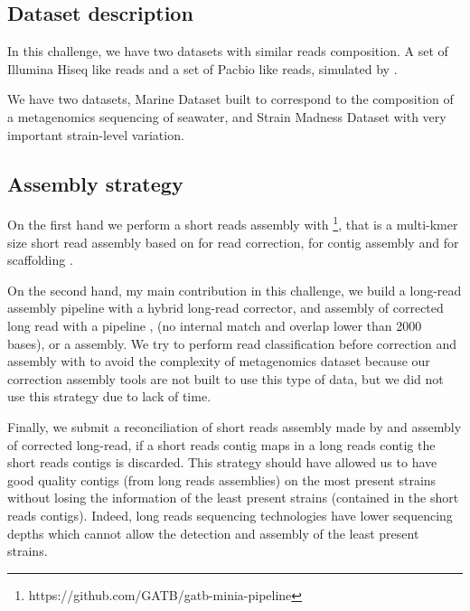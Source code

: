 \documentclass[main.tex]{subfiles}
\begin{document}
\subsection{Dataset description}

In this challenge, we have two datasets with similar reads composition. A set of Illumina Hiseq like reads and a set of Pacbio like reads, simulated by \cite{camisim}.

We have two datasets, Marine Dataset built to correspond to the composition of a metagenomics sequencing of seawater, and Strain Madness Dataset with very important strain-level variation.

\subsection{Assembly strategy}

On the first hand we perform a short reads assembly with  \footnote{https://github.com/GATB/gatb-minia-pipeline}, that is a multi-kmer size short read assembly based on  \cite{bloocoo} for read correction,  \cite{minia, bcalm} for contig assembly and  for scaffolding \cite{besst1, besst2, besst3}.

On the second hand, my main contribution in this challenge, we build a long-read assembly pipeline with  \cite{fmlrc} a hybrid long-read corrector, and assembly of corrected long read with a pipeline \minimap, \fpa (no internal match and overlap lower than 2000 bases), \miniasm or a \wtdbg assembly. We try to perform read classification before correction and assembly with \cite{centrifuge} to avoid the complexity of metagenomics dataset because our correction assembly tools are not built to use this type of data, but we did not use this strategy due to lack of time.

Finally, we submit a reconciliation of short reads assembly made by  and \wtdbg assembly of corrected long-read, if a short reads contig maps in a long reads contig the short reads contigs is discarded. This strategy should have allowed us to have good quality contigs (from long reads assemblies) on the most present strains without losing the information of the least present strains (contained in the short reads contigs). Indeed, long reads sequencing technologies have lower sequencing depths which cannot allow the detection and assembly of the least present strains.
\end{document}
